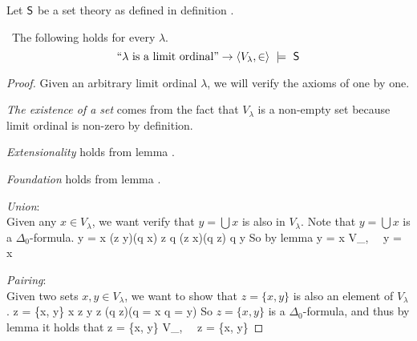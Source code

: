 Let $\sf{S}$ be a set theory as defined in definition . 
\begin{lemma}\label{lemma:scm_s_is_limit}\
The following holds for every $\lambda$.
\begin{equation}
\mbox{``$\lambda$ is a limit ordinal''} \then \langle V_\lambda, \in \rangle~\models~\sf{S} %
\end{equation}
\end{lemma}

\begin{proof}
Given an arbitrary limit ordinal $\lambda$, we will verify the axioms of  one by one.
\bce[(i)]
\item \emph{The existence of a set} comes from the fact that $V_\lambda$ is a non-empty set because limit ordinal is non-zero by definition.

\item \emph{Extensionality} holds from lemma .

\item \emph{Foundation} holds from lemma .

\item \emph{Union}:\\ %
Given any $x \in V_\lambda$, we want verify that $y = \bigcup x$ is also in $V_\lambda$. Note that $y = \bigcup x$ is a $\Delta_0$-formula.
\beq
y = \bigcup x \iff (\forall z \in y)(\exists q \in x) z \in q \et (\forall z \in x)(\forall q \in z) q \in y
\eeq
So by lemma 
\beq
y = \bigcup x \iff \langle V_\lambda, \in \rangle~\models~y = \bigcup x
\eeq

\item \emph{Pairing}: \\ %
Given two sets $x, y \in V_\lambda$, we want to show that $z = \{x, y\}$ is also an element of $V_\lambda$.
\beq
z = \{x, y\} \iff x \in z \et y \in z \et (\forall q \in z)(q = x \lor q = y)
\eeq
So $z = \{x, y\}$ is a $\Delta_0$-formula, and thus by lemma  it holds that
\beq
z = \{x, y\} \iff \langle V_\lambda, \in \rangle~\models~z = \{x, y\}
\eeq



\end{proof}
